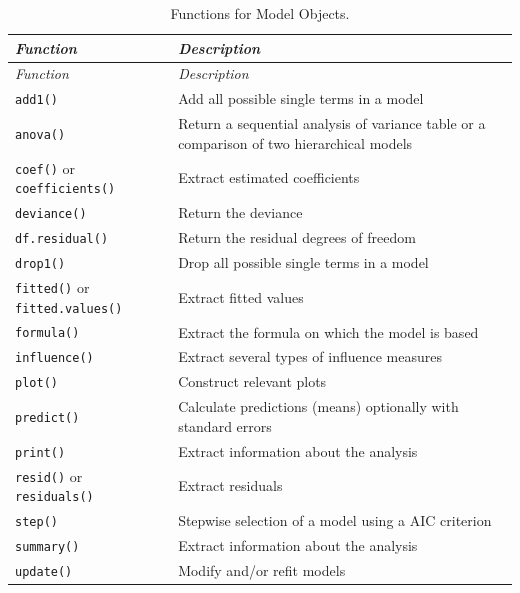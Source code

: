 \documentclass[
]{book}
\begin{document}
\begin{longtable}[]{@{}
  >{\raggedright\arraybackslash}p{}
  >{\raggedright\arraybackslash}p{}@{}}
\caption{\label{tab:ModelObjectFuncs} Functions for Model Objects.}\tabularnewline
\toprule\noalign{}
\begin{minipage}[b]{\linewidth}\raggedright
\emph{{Function}}
\end{minipage} & \begin{minipage}[b]{\linewidth}\raggedright
\emph{{Description}}
\end{minipage} \\
\midrule\noalign{}
\endfirsthead
\toprule\noalign{}
\begin{minipage}[b]{\linewidth}\raggedright
\emph{{Function}}
\end{minipage} & \begin{minipage}[b]{\linewidth}\raggedright
\emph{{Description}}
\end{minipage} \\
\midrule\noalign{}
\endhead
\bottomrule\noalign{}
\endlastfoot
\texttt{add1()} & Add all possible single terms in a model \\
\texttt{anova()} & Return a sequential analysis of variance table or a comparison of two hierarchical models \\
\texttt{coef()} or \texttt{coefficients()} & Extract estimated coefficients \\
\texttt{deviance()} & Return the deviance \\
\texttt{df.residual()} & Return the residual degrees of freedom \\
\texttt{drop1()} & Drop all possible single terms in a model \\
\texttt{fitted()} or \texttt{fitted.values()} & Extract fitted values \\
\texttt{formula()} & Extract the formula on which the model is based \\
\texttt{influence()} & Extract several types of influence measures \\
\texttt{plot()} & Construct relevant plots \\
\texttt{predict()} & Calculate predictions (means) optionally with standard errors \\
\texttt{print()} & Extract information about the analysis \\
\texttt{resid()} or \texttt{residuals()} & Extract residuals \\
\texttt{step()} & Stepwise selection of a model using a AIC criterion \\
\texttt{summary()} & Extract information about the analysis \\
\texttt{update()} & Modify and/or refit models \\
\end{longtable}
\end{document}
